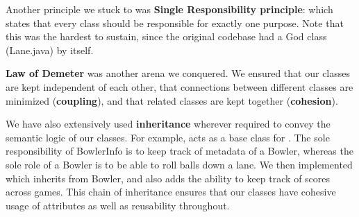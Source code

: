 Another principle we stuck to was \textbf{Single Responsibility principle}: which states that every class should be responsible for exactly one purpose. Note that this was the hardest to sustain, since the original codebase had a God class (Lane.java) by itself.

\textbf{Law of Demeter} was another arena we conquered. We ensured that our classes are kept independent of each other, that connections between different classes are minimized (\textbf{coupling}), and that related classes are kept together (\textbf{cohesion}).

We have also extensively used \textbf{inheritance} wherever required to convey the semantic logic of our classes. For example,  acts as a base class for . The sole responsibility of BowlerInfo is to keep track of metadata of a Bowler, whereas the sole role of a Bowler is to be able to roll balls down a lane. We then implemented  which inherits from Bowler, and also adds the ability to keep track of scores across games. This chain of inheritance ensures that our classes have cohesive usage of attributes as well as reusability throughout.
